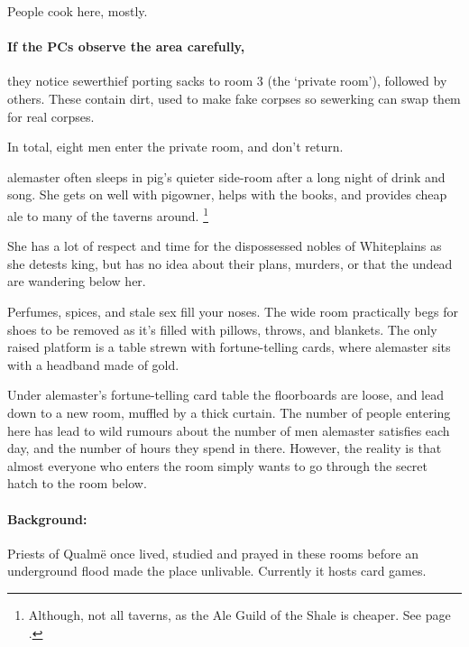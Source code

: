 \begin{multicols}{2}
People cook here, mostly.

\paragraph{If the PCs observe the area carefully,}
they notice \gls{sewerthief} porting sacks to room 3 (the `private room'), followed by others.
These contain dirt, used to make fake corpses so \gls{sewerking} can swap them for real corpses.

In total, eight men enter the private room, and don't return.

\pigowner


\Gls{alemaster} often sleeps in \gls{pig}'s quieter side-room after a long night of drink and song.
She gets on well with \gls{pigowner}, helps with the books, and provides cheap ale to many of the taverns around.%
\footnote{Although, not all taverns, as the Ale Guild of the Shale is cheaper.
See page \pageref{troubleAle}.}

She has a lot of respect and time for the dispossessed nobles of Whiteplains as she detests \gls{king}, but has no idea about their plans, murders, or that the undead are wandering below her.

\begin{boxtext}

  Perfumes, spices, and stale sex fill your noses.
  The wide room practically begs for shoes to be removed as it's filled with pillows, throws, and blankets.
  The only raised platform is a table strewn with fortune-telling cards, where \gls{alemaster} sits with a headband made of gold.

\end{boxtext}

Under \gls{alemaster}'s fortune-telling card table the floorboards are loose, and lead down to a new room, muffled by a thick curtain.
The number of people entering here has lead to wild rumours about the number of men \gls{alemaster} satisfies each day, and the number of hours they spend in there.
However, the reality is that almost everyone who enters the room simply wants to go through the secret hatch to the room below.

\alemaster


\paragraph{Background:}
Priests of Qualm\"{e} once lived, studied and prayed in these rooms before an underground flood made the place unlivable.
Currently it hosts card games.


\end{multicols}
